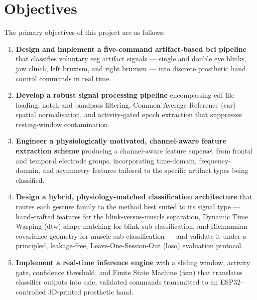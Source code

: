 \section{Objectives}
\label{sec:objectives}

The primary objectives of this project are as follows:

\begin{enumerate}[leftmargin=*, label=\textbf{O\arabic*.}]

    \item \textbf{Design and implement a five-command artifact-based
    \acrshort{bci} pipeline} that classifies voluntary
    \acrshort{eeg} artifact signals — single and double eye blinks,
    jaw clinch, left bruxism, and right bruxism — into discrete
    prosthetic hand control commands in real time.

    \item \textbf{Develop a robust signal processing pipeline}
    encompassing \acrshort{edf} file loading, notch and bandpass
    filtering, Common Average Reference (\acrshort{car}) spatial
    normalisation, and activity-gated epoch extraction that
    suppresses resting-window contamination.

    \item \textbf{Engineer a physiologically motivated, channel-aware
    feature extraction scheme} producing a channel-aware feature
    superset from frontal and temporal electrode groups, incorporating
    time-domain, frequency-domain, and asymmetry features tailored
    to the specific artifact types being classified.

    \item \textbf{Design a hybrid, physiology-matched classification
    architecture} that routes each gesture family to the method best
    suited to its signal type — hand-crafted features for the
    blink-versus-muscle separation, Dynamic Time Warping
    (\acrshort{dtw}) shape-matching for blink sub-classification, and
    Riemannian covariance geometry for muscle sub-classification —
    and validate it under a principled, leakage-free,
    Leave-One-Session-Out (\acrshort{loso}) evaluation protocol.

    \item \textbf{Implement a real-time inference engine} with a
    sliding window, activity gate, confidence threshold, and Finite
    State Machine (\acrshort{fsm}) that translates classifier outputs
    into safe, validated commands transmitted to an ESP32-controlled
    3D-printed prosthetic hand.


\end{enumerate}
